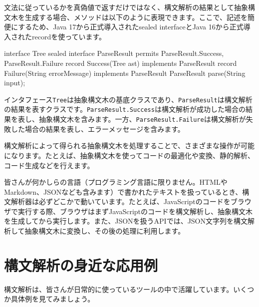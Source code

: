 文法に従っているかを真偽値で返すだけではなく、構文解析の結果として抽象構文木を生成する場合、メソッドは以下のように表現できます。ここで、記述を簡便にするため、Java
17から正式導入されたsealed interfaceとJava
16から正式導入されたrecordを使っています。

\begin{codescreen}{}
interface Tree {}
sealed interface ParseResult 
  permits ParseResult.Success, ParseResult.Failure {
  record Success(Tree ast) implements ParseResult {}
  record Failure(String errorMessage) implements ParseResult {}
}
ParseResult parse(String input);
\end{codescreen}

インタフェース\texttt{Tree}は抽象構文木の基底クラスであり、\texttt{ParseResult}は構文解析の結果を表すクラスです。\texttt{ParseResult.Success}は構文解析が成功した場合の結果を表し、抽象構文木を含みます。一方、\texttt{ParseResult.Failure}は構文解析が失敗した場合の結果を表し、エラーメッセージを含みます。

構文解析によって得られる抽象構文木を処理することで、さまざまな操作が可能になります。たとえば、抽象構文木を使ってコードの最適化や変換、静的解析、コード生成などを行えます。

皆さんが何かしらの言語（プログラミング言語に限りません。HTMLやMarkdown、JSONなども含みます）で書かれたテキストを扱っているとき、構文解析器は必ずどこかで動いています。たとえば、JavaScriptのコードをブラウザで実行する際、ブラウザはまずJavaScriptのコードを構文解析し、抽象構文木を生成してから実行します。また、JSONを扱うAPIでは、JSON文字列を構文解析して抽象構文木に変換し、その後の処理に利用します。

\section*{構文解析の身近な応用例}\label{0.3}

構文解析は、皆さんが日常的に使っているツールの中で活躍しています。いくつか具体例を見てみましょう。

